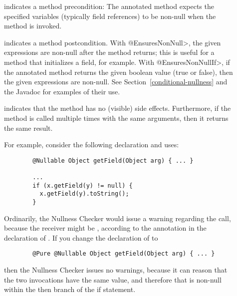 \begin{description}

\item[]
  indicates a method precondition:  The annotated method expects the
  specified variables (typically field references) to be non-null when the
  method is invoked.

\item[]
\item[]
  indicates a method postcondition.  With \<@EnsuresNonNull>, the given
  expressions are non-null after the method returns; this is useful for a
  method that initializes a field, for example.  With
  \<@EnsuresNonNullIf>, if the annotated
  method returns the given boolean value (true or false), then the given
  expressions are non-null.  See Section~\ref{conditional-nullness} and the
  Javadoc for examples of their use.

\item[]
  indicates that the method has no (visible) side effects.
  Furthermore, if the method is called multiple times with the same
  arguments, then it returns the same result.

  For example, consider the
  following declaration and uses:

\begin{Verbatim}
        @Nullable Object getField(Object arg) { ... }

        ...
        if (x.getField(y) != null) {
          x.getField(y).toString();
        }
\end{Verbatim}

  \noindent
  Ordinarily, the Nullness Checker would issue a warning regarding the
   call, because the receiver  might
  be , according to the  annotation in the
  declaration of .  If you change the declaration of
   to

\begin{Verbatim}
        @Pure @Nullable Object getField(Object arg) { ... }
\end{Verbatim}

  \noindent
  then the Nullness Checker issues no warnings, because it can reason that
  the two invocations  have the same value, and
  therefore that  is non-null within the then branch
  of the if statement.



\end{description}
